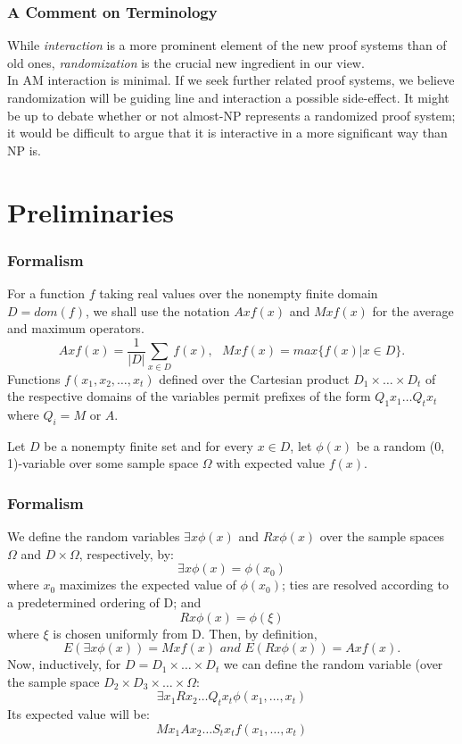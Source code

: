\documentclass{beamer}
\begin{document}
\begin{frame}
\frametitle{A Comment on Terminology}
While \textit{interaction} is a more prominent element of the new proof systems than of old ones, \textit{randomization} is the crucial new ingredient in our view.\\
In AM interaction is minimal. If we seek further related proof systems, we believe randomization will be guiding line and interaction a possible side-effect. It might be up to debate whether or not almost-NP represents a randomized proof system; it would be difficult to argue that it is interactive in a more significant way than NP is.
\end{frame}

\section{Preliminaries}
\begin{frame}
\frametitle{Formalism}
For a function $f$ taking real values over the nonempty finite domain $D = dom(f)$, we shall use the notation $Axf(x)$ and $Mxf(x)$ for the average and maximum operators.
$$Axf(x) = \frac{1}{|D|}\sum_{x \in D}f(x),\texttt{   } Mxf(x) = max\{f(x) | x \in D\}.$$
Functions $f(x_1, x_2,\ldots, x_t)$ defined over the Cartesian product $D_1 \times \ldots \times D_t$ of the respective domains of the variables permit prefixes of the form $Q_1 x_1 \ldots Q_t x_t$ where $Q_i = M$ or $A$.

Let $D$ be a nonempty finite set and for every $x \in D$, let $\phi(x)$ be a random (0, 1)-variable over some sample space $\Omega$ with expected value $f(x)$. 
\end{frame}

\begin{frame}
\frametitle{Formalism}
We define the random variables $\exists x \phi (x)$ and $R x \phi (x)$ over the sample spaces $\Omega$ and $D \times \Omega$, respectively, by: $$ \exists x \phi (x) = \phi(x_0)$$
where $x_0$ maximizes the expected value of $\phi(x_0)$; ties are resolved according to a predetermined ordering of D; and $$R x \phi(x) = \phi(\xi)$$
where $\xi$ is chosen uniformly from D.
Then, by definition, $$E(\exists x \phi(x)) = M x f(x) \textit{  and  } E(R x \phi(x)) = A x f(x).$$
Now, inductively, for $D = D_1 \times \ldots \times D_t$ we can define the random variable (over the sample space $D_2 \times D_3 \times \ldots \times \Omega$: $$\exists x_1 R x_2 \ldots Q_t x_t \phi(x_1, \ldots, x_t)$$
Its expected value will be: $$M x_1 A x_2 \ldots S_t x_t f(x_1, \ldots, x_t)$$
\end{frame}
\end{document}
